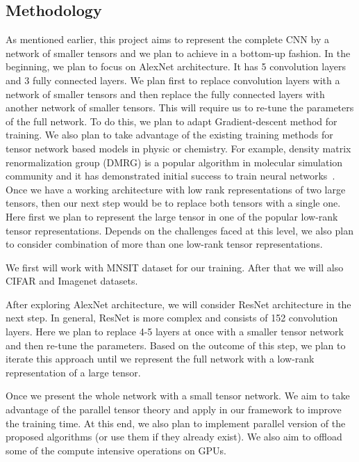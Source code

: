\subsection*{Methodology} 


As mentioned earlier, this project aims to represent the complete CNN by a network of smaller tensors and we plan to achieve in a bottom-up fashion. In the beginning, we plan to focus on AlexNet architecture. It has 5 convolution layers and 3 fully connected layers. We plan first to replace convolution layers with a network of smaller tensors and then replace the fully connected layers with another network of smaller tensors. This will require us to re-tune the parameters of the full network. To do this, we plan to adapt Gradient-descent method for training. We also plan to take advantage of the existing training methods for tensor network based models in physic or chemistry. For example, density matrix renormalization group (DMRG) is a popular algorithm in molecular simulation community and it has demonstrated initial success to train neural networks~\cite{SS-NIPS2016}. Once we have a working architecture with low rank representations of two large tensors, then our next step would be to replace both tensors with a single one. Here first we plan to represent the large tensor in one of the popular low-rank tensor representations. Depends on the challenges faced at this level, we also plan to consider combination of more than one low-rank tensor representations.    


We first will work with  MNSIT dataset for our training. After that we will also CIFAR and Imagenet datasets. 

After exploring AlexNet architecture, we will consider ResNet architecture in the next step. In general, ResNet is more complex and consists of 152 convolution layers. Here we plan to replace 4-5 layers at once with a smaller tensor network and then re-tune the parameters. Based on the outcome of this step, we plan to iterate this approach until we represent the full network with a low-rank representation of a large tensor.  

Once we present the whole network with a small tensor network. We aim to take advantage of the parallel tensor theory and apply in our framework to improve the training time. At this end, we also plan to implement parallel version of the proposed algorithms (or use them if they already exist). We also aim to offload some of the compute intensive operations on GPUs.   

